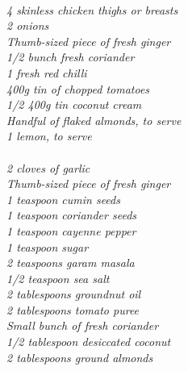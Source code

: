 \documentclass{tufte-book}
\begin{document}
\\\emph{4 skinless chicken thighs or breasts
\\2 onions
\\Thumb-sized piece of fresh ginger
\\1/2 bunch fresh coriander
\\1 fresh red chilli
\\400g tin of chopped tomatoes
\\1/2 400g tin coconut cream
\\Handful of flaked almonds, to serve
\\1 lemon, to serve}
\\
\\\emph{2 cloves of garlic
\\Thumb-sized piece of fresh ginger
\\1 teaspoon cumin seeds
\\1 teaspoon coriander seeds
\\1 teaspoon cayenne pepper
\\1 teaspoon sugar
\\2 teaspoons garam masala
\\1/2 teaspoon sea salt
\\2 tablespoons groundnut oil
\\2 tablespoons tomato puree
\\Small bunch of fresh coriander
\\1/2 tablespoon desiccated coconut
\\2 tablespoons ground almonds}
\end{document}
